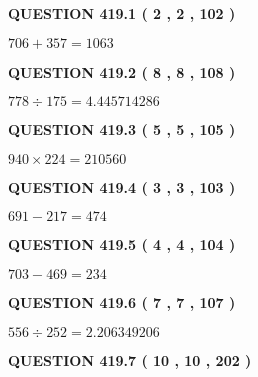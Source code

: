 \documentclass{ctexart}
\begin{document}
{\textbf{\Large{QUESTION
419.1 
 ( 2 , 2 , 102 )
}}}
  
  
 
 

$ %
706 +  %
357=   %
1063$
 
 
  
\vspace{0.2in}
  
{\textbf{\Large{QUESTION
419.2 
 ( 8 , 8 , 108 )
}}}
  
  
 
 

$ %
778 \div  %
175=   %
4.445714286$
 
 
  
\vspace{0.2in}
  
{\textbf{\Large{QUESTION
419.3 
 ( 5 , 5 , 105 )
}}}
  
  
 
 

$ %
940 \times  %
224=   %
210560$
 
 
  
\vspace{0.2in}
  
{\textbf{\Large{QUESTION
419.4 
 ( 3 , 3 , 103 )
}}}
  
  
 
 

$ %
691 -  %
217=   %
474$
 
 
  
\vspace{0.2in}
  
{\textbf{\Large{QUESTION
419.5 
 ( 4 , 4 , 104 )
}}}
  
  
 
 

$ %
703 -  %
469=   %
234$
 
 
  
\vspace{0.2in}
  
{\textbf{\Large{QUESTION
419.6 
 ( 7 , 7 , 107 )
}}}
  
  
 
 

$ %
556 \div  %
252=   %
2.206349206$
 
 
  
\vspace{0.2in}
  
{\textbf{\Large{QUESTION
419.7 
 ( 10 , 10 , 202 )
}}}
  
  
  
\vspace{0.2in}
  
\end{document}
